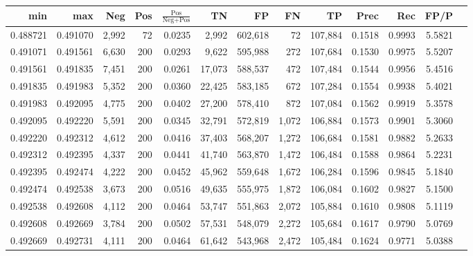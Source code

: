 \begin{tabular}{rrrrrrrrrrrrr}
\toprule
     min &      max &   Neg & Pos & $\frac{\text{Pos}}{\text{Neg}+\text{Pos}}$ &      TN &      FP &      FN &      TP &   Prec &    Rec &   FP/P \\
\midrule
0.488721 & 0.491070 & 2,992 &  72 &                                     0.0235 &   2,992 & 602,618 &      72 & 107,884 & 0.1518 & 0.9993 & 5.5821 \\
0.491071 & 0.491561 & 6,630 & 200 &                                     0.0293 &   9,622 & 595,988 &     272 & 107,684 & 0.1530 & 0.9975 & 5.5207 \\
0.491561 & 0.491835 & 7,451 & 200 &                                     0.0261 &  17,073 & 588,537 &     472 & 107,484 & 0.1544 & 0.9956 & 5.4516 \\
0.491835 & 0.491983 & 5,352 & 200 &                                     0.0360 &  22,425 & 583,185 &     672 & 107,284 & 0.1554 & 0.9938 & 5.4021 \\
0.491983 & 0.492095 & 4,775 & 200 &                                     0.0402 &  27,200 & 578,410 &     872 & 107,084 & 0.1562 & 0.9919 & 5.3578 \\
0.492095 & 0.492220 & 5,591 & 200 &                                     0.0345 &  32,791 & 572,819 &   1,072 & 106,884 & 0.1573 & 0.9901 & 5.3060 \\
0.492220 & 0.492312 & 4,612 & 200 &                                     0.0416 &  37,403 & 568,207 &   1,272 & 106,684 & 0.1581 & 0.9882 & 5.2633 \\
0.492312 & 0.492395 & 4,337 & 200 &                                     0.0441 &  41,740 & 563,870 &   1,472 & 106,484 & 0.1588 & 0.9864 & 5.2231 \\
0.492395 & 0.492474 & 4,222 & 200 &                                     0.0452 &  45,962 & 559,648 &   1,672 & 106,284 & 0.1596 & 0.9845 & 5.1840 \\
0.492474 & 0.492538 & 3,673 & 200 &                                     0.0516 &  49,635 & 555,975 &   1,872 & 106,084 & 0.1602 & 0.9827 & 5.1500 \\
0.492538 & 0.492608 & 4,112 & 200 &                                     0.0464 &  53,747 & 551,863 &   2,072 & 105,884 & 0.1610 & 0.9808 & 5.1119 \\
0.492608 & 0.492669 & 3,784 & 200 &                                     0.0502 &  57,531 & 548,079 &   2,272 & 105,684 & 0.1617 & 0.9790 & 5.0769 \\
0.492669 & 0.492731 & 4,111 & 200 &                                     0.0464 &  61,642 & 543,968 &   2,472 & 105,484 & 0.1624 & 0.9771 & 5.0388 \\

\end{tabular}

